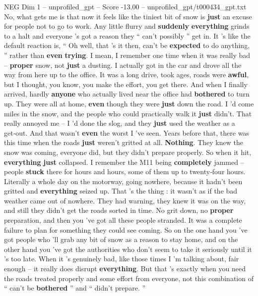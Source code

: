 \begin{textsample}{NEG Dim 1 – unprofiled\_gpt – Score -13.00 – unprofiled\_gpt/t000434\_gpt.txt}  \label{ex:f1_neg_021}
No, what gets me is that now it feels like the tiniest bit of snow is \textbf{just} an excuse for people not to go to work.
Any little flurry and \textbf{suddenly} \textbf{everything} grinds to a halt and everyone ’s got a reason they “ can't possibly ” get in.
It ’s like the default reaction is, “ Oh well, that ’s it then, can't be \textbf{expected} to do anything, ” rather than \textbf{even} \textbf{trying}.
I mean, I remember one time when it was really bad – \textbf{proper} snow, not \textbf{just} a dusting.
I actually got in the car and drove all the way from here up to the office.
It was a long drive, took ages, roads were \textbf{awful}, but I thought, you know, you make the effort, you get there.
And when I finally arrived, hardly \textbf{anyone} who actually lived near the office had \textbf{bothered} to turn up.
They were all at home, \textbf{even} though they were \textbf{just} down the road.
I ’d come miles in the snow, and the people who could practically walk it \textbf{just} didn't.
That really annoyed me – I ’d done the slog, and they \textbf{just} used the weather as a get‑out.
And that wasn't \textbf{even} the worst I ’ve seen.
Years before that, there was this time when the roads \textbf{just} weren't gritted at all. \textbf{Nothing}.
They knew the snow was coming, everyone did, but they didn't prepare properly.
So when it hit, \textbf{everything} \textbf{just} collapsed.
I remember the M11 being \textbf{completely} jammed – people \textbf{stuck} there for hours and hours, some of them up to twenty‑four hours.
Literally a whole day on the motorway, going nowhere, because it hadn't been gritted and \textbf{everything} seized up.
That ’s the thing : it wasn't as if the bad weather came out of nowhere.
They had warning, they knew it was on the way, and still they didn't get the roads sorted in time.
No grit down, no \textbf{proper} preparation, and then you ’ve got all these people stranded.
It was a complete failure to plan for something they could see coming.
So on the one hand you ’ve got people who ’ll grab any bit of snow as a reason to stay home, and on the other hand you ’ve got the authorities who don't seem to take it seriously until it ’s too late.
When it ’s genuinely bad, like those times I ’m talking about, fair enough – it really does disrupt \textbf{everything}.
But that ’s exactly when you need the roads treated properly and some effort from everyone, not this combination of “ can't be \textbf{bothered} ” and “ didn't prepare. ”

\end{textsample}
